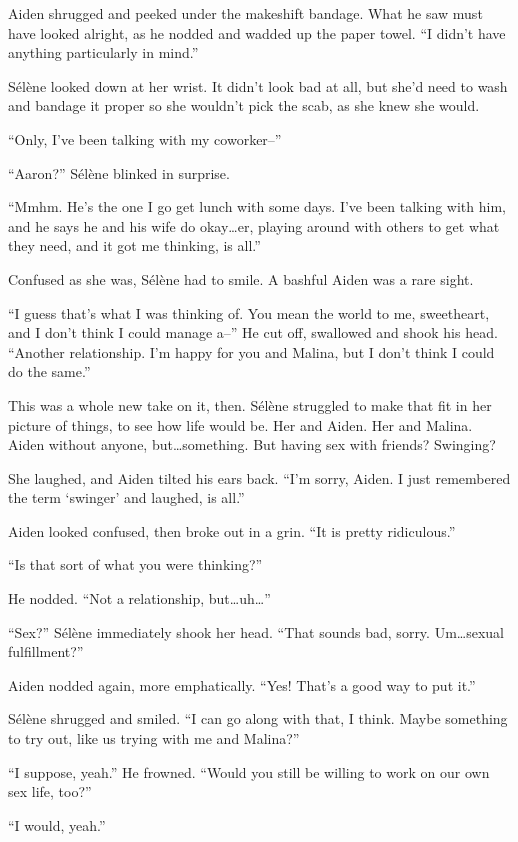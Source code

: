 Aiden shrugged and peeked under the makeshift bandage. What he saw must have looked alright, as he nodded and wadded up the paper towel. ``I didn't have anything particularly in mind.''

Sélène looked down at her wrist. It didn't look bad at all, but she'd need to wash and bandage it proper so she wouldn't pick the scab, as she knew she would.

``Only, I've been talking with my coworker--''

``Aaron?'' Sélène blinked in surprise.

``Mmhm. He's the one I go get lunch with some days. I've been talking with him, and he says he and his wife do okay\ldots{}er, playing around with others to get what they need, and it got me thinking, is all.''

Confused as she was, Sélène had to smile. A bashful Aiden was a rare sight.

``I guess that's what I was thinking of. You mean the world to me, sweetheart, and I don't think I could manage a--'' He cut off, swallowed and shook his head. ``Another relationship. I'm happy for you and Malina, but I don't think I could do the same.''

This was a whole new take on it, then. Sélène struggled to make that fit in her picture of things, to see how life would be. Her and Aiden. Her and Malina. Aiden without anyone, but\ldots{}something. But having sex with friends? Swinging?

She laughed, and Aiden tilted his ears back. ``I'm sorry, Aiden. I just remembered the term `swinger' and laughed, is all.''

Aiden looked confused, then broke out in a grin. ``It is pretty ridiculous.''

``Is that sort of what you were thinking?''

He nodded. ``Not a relationship, but\ldots{}uh\ldots{}''

``Sex?'' Sélène immediately shook her head. ``That sounds bad, sorry. Um\ldots{}sexual fulfillment?''

Aiden nodded again, more emphatically. ``Yes! That's a good way to put it.''

Sélène shrugged and smiled. ``I can go along with that, I think. Maybe something to try out, like us trying with me and Malina?''

``I suppose, yeah.'' He frowned. ``Would you still be willing to work on our own sex life, too?''

``I would, yeah.''

